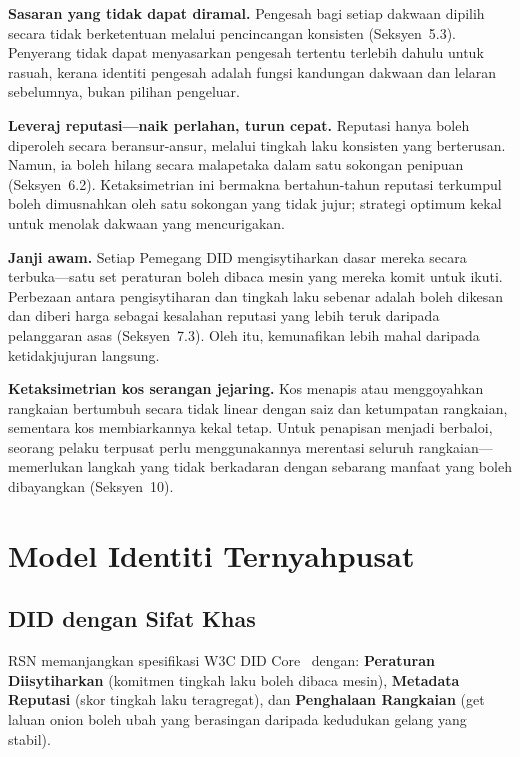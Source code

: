 \documentclass[11pt,a4paper,twocolumn]{article}
\begin{document}
\textbf{Sasaran yang tidak dapat diramal.} Pengesah bagi setiap dakwaan dipilih secara tidak berketentuan melalui pencincangan konsisten (Seksyen~5.3). Penyerang tidak dapat menyasarkan pengesah tertentu terlebih dahulu untuk rasuah, kerana identiti pengesah adalah fungsi kandungan dakwaan dan lelaran sebelumnya, bukan pilihan pengeluar.

\textbf{Leveraj reputasi---naik perlahan, turun cepat.} Reputasi hanya boleh diperoleh secara beransur-ansur, melalui tingkah laku konsisten yang berterusan. Namun, ia boleh hilang secara malapetaka dalam satu sokongan penipuan (Seksyen~6.2). Ketaksimetrian ini bermakna bertahun-tahun reputasi terkumpul boleh dimusnahkan oleh satu sokongan yang tidak jujur; strategi optimum kekal untuk menolak dakwaan yang mencurigakan.

\textbf{Janji awam.} Setiap Pemegang DID mengisytiharkan dasar mereka secara terbuka---satu set peraturan boleh dibaca mesin yang mereka komit untuk ikuti. Perbezaan antara pengisytiharan dan tingkah laku sebenar adalah boleh dikesan dan diberi harga sebagai kesalahan reputasi yang lebih teruk daripada pelanggaran asas (Seksyen~7.3). Oleh itu, kemunafikan lebih mahal daripada ketidakjujuran langsung.

\textbf{Ketaksimetrian kos serangan jejaring.} Kos menapis atau menggoyahkan rangkaian bertumbuh secara tidak linear dengan saiz dan ketumpatan rangkaian, sementara kos membiarkannya kekal tetap. Untuk penapisan menjadi berbaloi, seorang pelaku terpusat perlu menggunakannya merentasi seluruh rangkaian---memerlukan langkah yang tidak berkadaran dengan sebarang manfaat yang boleh dibayangkan (Seksyen~10).

\section{Model Identiti Ternyahpusat}

\subsection{DID dengan Sifat Khas}

RSN memanjangkan spesifikasi W3C DID Core~\cite{did2022} dengan: \textbf{Peraturan Diisytiharkan} (komitmen tingkah laku boleh dibaca mesin), \textbf{Metadata Reputasi} (skor tingkah laku teragregat), dan \textbf{Penghalaan Rangkaian} (get laluan onion boleh ubah yang berasingan daripada kedudukan gelang yang stabil).
\end{document}
